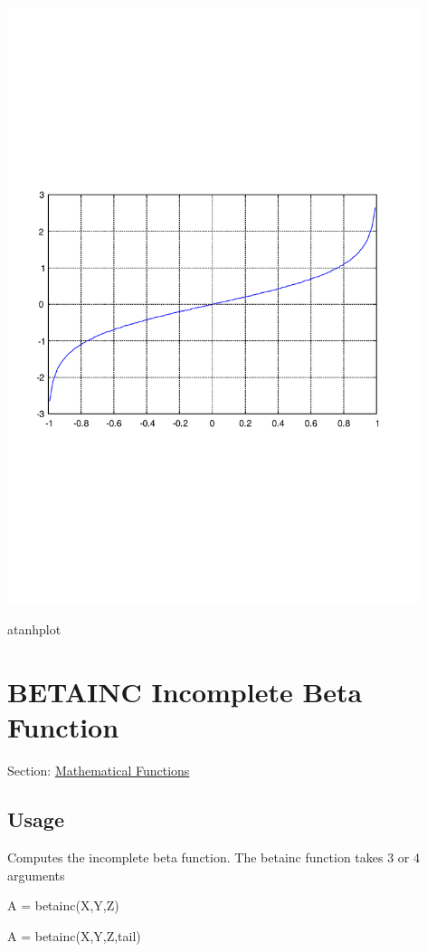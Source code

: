  
\begin{DoxyImage}
\includegraphics[width=12cm]{atanhplot}
\caption{atanhplot}
\end{DoxyImage}
 \hypertarget{mathfunctions_betainc}{}\section{B\-E\-T\-A\-I\-N\-C Incomplete Beta Function}\label{mathfunctions_betainc}
Section\-: \hyperlink{sec_mathfunctions}{Mathematical Functions} \hypertarget{vtkwidgets_vtkxyplotwidget_Usage}{}\subsection{Usage}\label{vtkwidgets_vtkxyplotwidget_Usage}
Computes the incomplete beta function. The {\ttfamily betainc} function takes 3 or 4 arguments \begin{DoxyVerb}  A = betainc(X,Y,Z)
\end{DoxyVerb}
 \begin{DoxyVerb}  A = betainc(X,Y,Z,tail)
\end{DoxyVerb}
